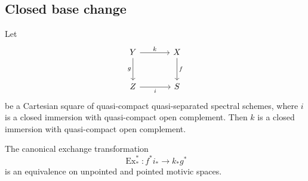 \subsection{Closed base change}

\begin{theorem}
\label{thm:unstable-closed-base-change}
Let
\[
\begin{tikzcd}[column sep=large, row sep=large]
    Y
        \arrow[r, "k"]
        \arrow[d, "g"']
    &
    X
        \arrow[d, "f"]
    \\
    Z
        \arrow[r, "i"']
    &
    S
\end{tikzcd}
\]
be a Cartesian square of quasi-compact quasi-separated spectral schemes,
where \(i\) is a closed immersion with quasi-compact open complement.
Then \(k\) is a closed immersion with quasi-compact open complement.

The canonical exchange transformation
\[
    \operatorname{Ex}^{*}_{*}
    \colon
    f^*i_*
    \longrightarrow
    k_*g^*
\]
is an equivalence on unpointed and pointed motivic spaces.
\end{theorem}

